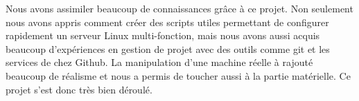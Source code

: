 Nous avons assimiler beaucoup de connaissances grâce à ce projet. Non seulement nous avons appris comment créer des scripts utiles permettant de configurer rapidement un serveur Linux multi-fonction, mais nous avons aussi acquis beaucoup d'expériences en gestion de projet avec des outils comme git et les services de chez Github. La manipulation d'une machine réelle à rajouté beaucoup de réalisme et nous a permis de toucher aussi à la partie matérielle. Ce projet s'est donc très bien déroulé.
